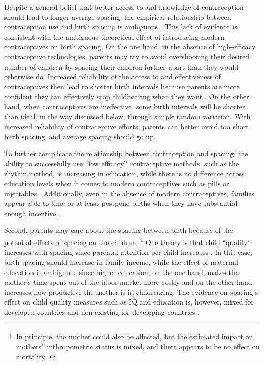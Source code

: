 Despite a general belief that better access to and knowledge of contraception 
should lead to longer average spacing, the empirical relationship between contraception 
use and birth spacing is ambiguous 
\citep{Tulasidhar1993,Whitworth2002,Bhalotra2008,Yeakey2009,Kim2010,Soest2018}.
This lack of evidence is consistent with the ambiguous theoretical effect of introducing 
modern contraceptives on birth spacing.
On the one hand, in the absence of high-efficacy contraceptive technologies, parents may try to 
avoid overshooting their desired number of children by spacing their children further apart
than they would otherwise do.
Increased reliability of the access to and effectiveness of contraceptives then lead to 
shorter birth intervals because parents are more confident they can effectively
stop childbearing when they want \citep{Keyfitz1971,Heckman1976}.
On the other hand, when contraceptives are ineffective, some birth intervals will
be shorter than ideal, in the way discussed below, through simple random variation.
With increased reliability of contraceptive efforts, parents can better avoid too short 
birth spacing, and average spacing should go up.

To further complicate the relationship between contraception and spacing, the ability 
to successfully use ``low efficacy'' contraceptive methods, such as the rhythm method, 
is increasing in education, while there is no difference across education levels 
when it comes to modern contraceptives such as pills or injectables \citep{Rosenzweig1989}.
Additionally, even in the absence of modern contraceptives, families appear able to 
time or at least postpone births when they have substantial enough incentive 
\citep{Jayachandran2011,Alam2018}.


Second, parents may care about the spacing between birth because of the 
potential effects of spacing on the children.%
\footnote{
In principle, the mother could also be affected, but the estimated impact on 
mothers' anthropometric status is mixed, and there appears to be no 
effect on mortality 
\citep{Ronsmans1998,Menken2003,Dewey2007,Conde-Agudelo2012}.
}
One theory is that child ``quality'' increases with spacing 
since parental attention per child increases
\citep{Zajonc1975,Zajonc1976,Razin1980}.
In this case, birth spacing should increase in family income, while the 
effect of maternal education is ambiguous since higher education, on the 
one hand, makes the mother's time spent out of the labor market more 
costly and on the other hand increases how productive the mother is 
in childrearing.
The evidence on spacing's effect on child quality measures such as IQ 
and education is, however, mixed for developed countries and non-existing 
for developing countries
\citep{Powell1993,Pettersson-Lidbom2009,Buckles2012,Barclay2017}.

